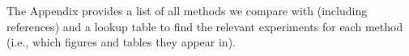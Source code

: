 

The Appendix provides a list of all methods we compare with (including references) and a lookup table to find the relevant experiments for each method (i.e., which figures and tables they appear in). 

